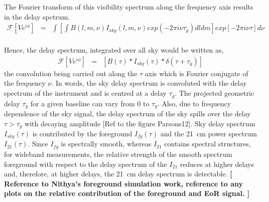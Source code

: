 \documentclass[12pt,preprint]{aastex}
\begin{document}
The Fourier transform of this visibility spectrum along the frequency axis results in the delay spctrum.
\begin{eqnarray}
\mathcal{F} \left [V e^{i\phi}\right] & = & \int \left [\int B(l,m, \nu) I_{sky}(l,m,\nu) exp(-2\pi i \nu \tau_{g} ) dl dm \right ] exp\left[ -2 \pi i\nu \tau \right] d\nu \nonumber\\
\label{eq3}
\end{eqnarray}

Hence, the delay spectrum, integrated over all sky would be written as, 
\begin{eqnarray}
\mathcal{F} \left [V e^{i\phi}\right]   & = &  \left [B(\tau)\ast I_{sky}(\tau) \ast \delta(\tau+\tau_{g}) \right ] 	
\label{eq4}
\end{eqnarray}
the convolution being carried out along the $\tau$ axis which is Fourier conjugate of the frequency $\nu$. In words, the sky delay spectrum is convoluted with the delay spectrum of the instrument and is centred at a delay $\tau_{g}$. The projected geometric delay $\tau_{g}$ for a given baseline can vary from 0 to $\tau_{g}$. Also, due to frequency dependence of the sky signal, the delay spectrum of the sky spills over the delay $\tau> \tau_{g}$ with decaying amplitude [Ref to the figure Parsons12]. Sky delay spectrum $I_{sky}(\tau)$ is contributed by the foreground  $I_{fg}(\tau)$ and the 21~cm power spectrum $I_{21}(\tau)$. Since $I_{fg}$ is spectrally smooth, whereas $I_{21}$ contains spectral structures, for wideband measurements, the relative strength of the smooth spectrum foreground with respect to the delay spectrum of the $I_{21}$ reduces at higher delays and, therefore, at higher delays, the 21~cm delay spectrum is detectable.  \textbf{[ Reference to Nithya's foreground simulation work, reference to any plots on the relative contribution of the  foreground and EoR signal. ]}
\end{document}
